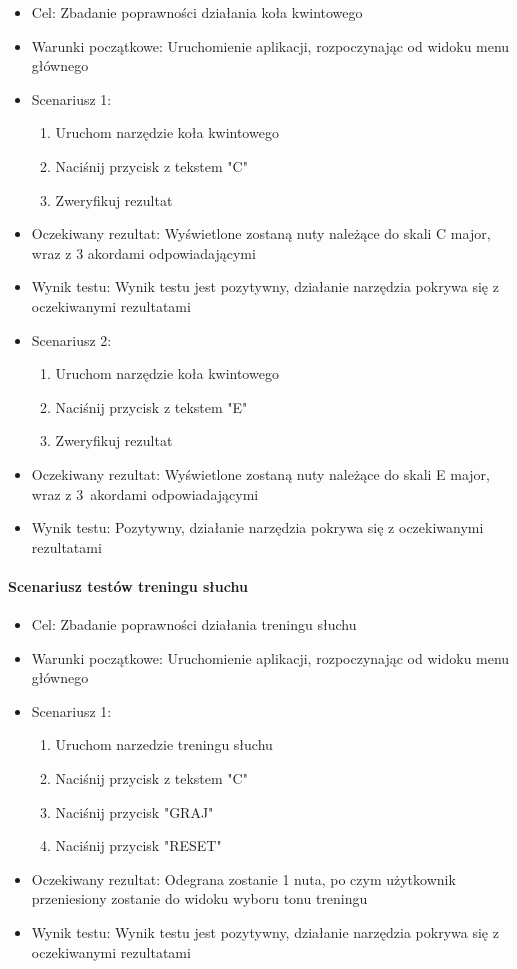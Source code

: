 \begin{itemize}
    \item Cel: Zbadanie poprawności działania koła kwintowego
    \item Warunki początkowe: Uruchomienie aplikacji, rozpoczynając od widoku menu głównego
    \item Scenariusz 1:
        \begin{enumerate}
            \item Uruchom narzędzie koła kwintowego
            \item Naciśnij przycisk z tekstem "C"
            \item Zweryfikuj rezultat
        \end{enumerate}
    \item Oczekiwany rezultat: Wyświetlone zostaną nuty należące do skali C major, wraz z 3 akordami odpowiadającymi 
    \item Wynik testu: Wynik testu jest pozytywny, działanie narzędzia pokrywa się z oczekiwanymi rezultatami
    \item Scenariusz 2:
        \begin{enumerate}
            \item Uruchom narzędzie koła kwintowego
            \item Naciśnij przycisk z tekstem "E"
            \item Zweryfikuj rezultat
        \end{enumerate}
    \item Oczekiwany rezultat: Wyświetlone zostaną nuty należące do skali E major, wraz z 3~akordami odpowiadającymi 
    \item Wynik testu: Pozytywny, działanie narzędzia pokrywa się z oczekiwanymi rezultatami
\end{itemize}

\paragraph{Scenariusz testów treningu słuchu}

\begin{itemize}
    \item Cel: Zbadanie poprawności działania treningu słuchu
    \item Warunki początkowe: Uruchomienie aplikacji, rozpoczynając od widoku menu głównego
    \item Scenariusz 1:
        \begin{enumerate}
            \item Uruchom narzedzie treningu słuchu
            \item Naciśnij przycisk z tekstem "C"
            \item Naciśnij przycisk "GRAJ"
            \item Naciśnij przycisk "RESET"
        \end{enumerate}
    \item Oczekiwany rezultat: Odegrana zostanie 1 nuta, po czym użytkownik przeniesiony zostanie do widoku wyboru tonu treningu
    \item Wynik testu: Wynik testu jest pozytywny, działanie narzędzia pokrywa się z oczekiwanymi rezultatami
\end{itemize}


